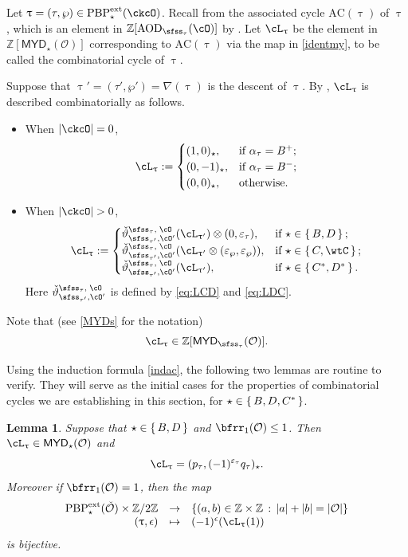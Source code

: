 \documentclass[11pt,a4paper]{amsart}
\newcommand{\AC}{\mathrm{AC}}
\def\MYD{{\mathsf{MYD}}}
\def\abs#1{\left|{#1}\right|}
\newcommand{\CO}{{\mathcal {O}}}
\newcommand{\Z}{\mathbb{Z}}
\newcommand{\be}{\begin {equation}}
\newcommand{\ee}{\end {equation}}
\numberwithin{equation}{section}
\newtheorem{lem}[thm]{Lemma}
\theoremstyle{remark}
\def\PBPes{\mathrm{PBP}^{\mathrm{ext}}_{\star}}
\def\uptaup{\uptau^{\prime}}
\def\MYD{{\mathsf{MYD}}}
\def\AOD{\mathrm{AOD}}
\def\AC{\mathrm{AC}}
\def\ac{\cL}
\def\lotimes{\otimes}
\begin{document}
Let  $\uptau=(\tau,\wp)\in \PBPes(\ckcO)$. Recall from  
the associated cycle $\AC(\uptau)$ of $\uptau$, which is an element in
$\Z[\AOD_{\sfss_\tau }(\cO)]$
by .
Let $\ac_{\uptau}$ be the element in $\Z[\MYD_{\star}(\CO)]$ corresponding to $\AC(\uptau)$ via the map in \eqref{identmy}, to be called the combinatorial cycle of $\uptau$. 

 Suppose that $\uptau'=(\tau',\wp')=\nabla(\uptau)$ is the descent of $\uptau$. By , $\ac_{\uptau}$  is
described  combinatorially as follows.
\begin{itemize}
\item
When $\abs{\ckcO}=0$,
\[
  \ac_{\uptau} :=
  \begin{cases}
   (1,0)_{\star}, & \text{if } \alpha_\tau=B^+;\\
   (0,-1)_{\star}, & \text{if } \alpha_\tau=B^-;\\
   (0,0)_{\star}, & \text{otherwise}.
  \end{cases}
\]
\item
When $\abs{\ckcO} >0$,
\be\label{indac}
\ac_{\uptau} :=
\begin{cases}
  \dlifttso(\ac_{\uptaup})\lotimes (0,\varepsilon_{\tau}),
  & \text{if } \star \in \set{B,D}; \\
  \dlifttso(\ac_{\uptaup}\lotimes (\varepsilon_{\wp},\varepsilon_{\wp})),
  & \text{if } \star\in \set{C,\wtC};\\
  \dlifttso(\ac_{\uptaup}),
  & \text{if } \star \in \set{C^*,D^{*}}. \\
\end{cases}
\ee
Here $\dlifttso$ is defined by \eqref{eq:LCD} and \eqref{eq:LDC}.
\end{itemize}

Note that (see \eqref{MYDs} for the notation)
\be\label{signactau}
\ac_\uptau\in \Z[\MYD_{\sfss_{\tau}}(\CO)].
\ee

Using %
the induction formula \eqref{indac}, the following two lemmas are routine to verify. 
They will serve as the initial cases for the properties of combinatorial cycles we are establishing in this section, for $\star \in \set{B,D,C^*}$.

\begin{lem}\label{eqtail2}
Suppose that $\star \in \set{B,D}$ and $\bfrr_1(\CO)\leq 1$. Then $\ac_{\uptau}\in \MYD_\star(\CO)$ and 
\[
  \ac_\uptau=
    (p_\tau, (-1)^{\varepsilon_\tau} q_\tau)_\star.
\]
Moreover if $\bfrr_1(\CO) =1$, then the map 
\[
\begin{array}{rcl} 
\PBPes(\check \CO)\times \Z/2\Z &\rightarrow &
\{(a,b)\in\Z\times \Z\,:\, \abs{a}+\abs{b}=\abs{\CO}\} \\
(\uptau,\epsilon)&\mapsto & (-1)^{\epsilon}(\ac_\uptau(1))
\end{array}
\]
is bijective. %

\end{lem}
\end{document}

